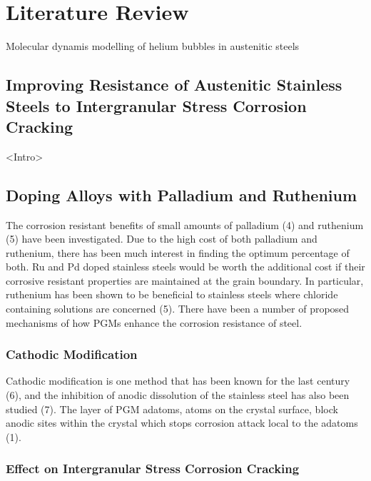 \chapter{Literature Review}

\begin{changemargin}{1.0cm}{1.0cm}
\end{changemargin}



Molecular dynamis modelling of helium bubbles in austenitic steels






\section{Improving Resistance of Austenitic Stainless Steels to Intergranular Stress Corrosion Cracking}

<Intro>

\section{Doping Alloys with Palladium and Ruthenium}

The corrosion resistant benefits of small amounts of palladium (4) and ruthenium (5) have been investigated.  Due to the high cost of both palladium and ruthenium, there has been much interest in finding the optimum percentage of both.  Ru and Pd doped stainless steels would be worth the additional cost if their corrosive resistant properties are maintained at the grain boundary.  In particular, ruthenium has been shown to be beneficial to stainless steels where chloride containing solutions are concerned (5).  There have been a number of proposed mechanisms of how PGMs enhance the corrosion resistance of steel.

\subsection{Cathodic Modification}

Cathodic modification is one method that has been known for the last century (6), and the inhibition of anodic dissolution of the stainless steel has also been studied (7).  The layer of PGM adatoms, atoms on the crystal surface, block anodic sites within the crystal which stops corrosion attack local to the adatoms (1).

\subsection{Effect on Intergranular Stress Corrosion Cracking}


